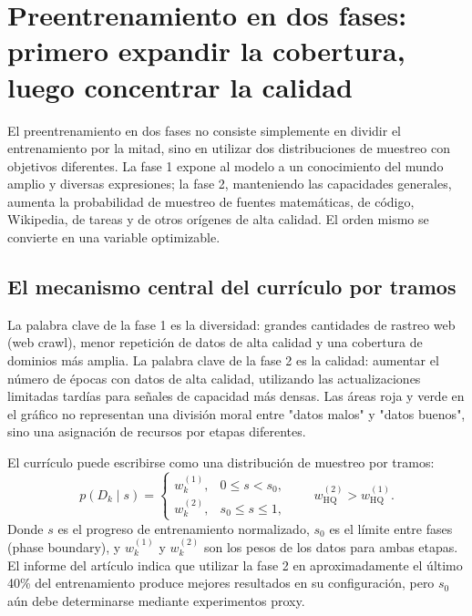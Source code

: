 \section{Preentrenamiento en dos fases: primero expandir la cobertura, luego concentrar la calidad}

El preentrenamiento en dos fases no consiste simplemente en dividir el entrenamiento por la mitad, sino en utilizar dos distribuciones de muestreo con objetivos diferentes. La fase 1 expone al modelo a un conocimiento del mundo amplio y diversas expresiones; la fase 2, manteniendo las capacidades generales, aumenta la probabilidad de muestreo de fuentes matemáticas, de código, Wikipedia, de tareas y de otros orígenes de alta calidad. El orden mismo se convierte en una variable optimizable.

\subsection{El mecanismo central del currículo por tramos}

La palabra clave de la fase 1 es la diversidad: grandes cantidades de rastreo web (web crawl), menor repetición de datos de alta calidad y una cobertura de dominios más amplia. La palabra clave de la fase 2 es la calidad: aumentar el número de épocas con datos de alta calidad, utilizando las actualizaciones limitadas tardías para señales de capacidad más densas. Las áreas roja y verde en el gráfico no representan una división moral entre "datos malos" y "datos buenos", sino una asignación de recursos por etapas diferentes.


El currículo puede escribirse como una distribución de muestreo por tramos:
\[
p(D_k\mid s)=
\begin{cases}
w_k^{(1)}, & 0\le s<s_0,\\
w_k^{(2)}, & s_0\le s\le 1,
\end{cases}
\qquad
w_{\text{HQ}}^{(2)}>w_{\text{HQ}}^{(1)}.
\]
Donde $s$ es el progreso de entrenamiento normalizado, $s_0$ es el límite entre fases (phase boundary), y $w_k^{(1)}$ y $w_k^{(2)}$ son los pesos de los datos para ambas etapas. El informe del artículo indica que utilizar la fase 2 en aproximadamente el último 40\% del entrenamiento produce mejores resultados en su configuración, pero $s_0$ aún debe determinarse mediante experimentos proxy.

